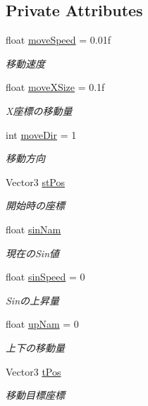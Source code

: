 \subsection*{Private Attributes}
\begin{DoxyCompactItemize}
\item 
float \hyperlink{class_bat_a44b5842b7610432d93cbdcbbbedccc95}{move\+Speed} = 0.\+01f
\begin{DoxyCompactList}\small\item\em 移動速度 \end{DoxyCompactList}\item 
float \hyperlink{class_bat_a125bd45781b88b039b4cd2b96ecf9a74}{move\+X\+Size} = 0.\+1f
\begin{DoxyCompactList}\small\item\em X座標の移動量 \end{DoxyCompactList}\item 
int \hyperlink{class_bat_aa26440807bdeba3f4e860d7b8510b46a}{move\+Dir} = 1
\begin{DoxyCompactList}\small\item\em 移動方向 \end{DoxyCompactList}\item 
Vector3 \hyperlink{class_bat_a00b206a83145c2273d7d6b4241562f60}{st\+Pos}
\begin{DoxyCompactList}\small\item\em 開始時の座標 \end{DoxyCompactList}\item 
float \hyperlink{class_bat_a8c2d220af1b500e9c2e26ef3ee18757f}{sin\+Nam}
\begin{DoxyCompactList}\small\item\em 現在の\+Sin値 \end{DoxyCompactList}\item 
float \hyperlink{class_bat_a1fdb20de00fd364c6cf94fefdfa4305a}{sin\+Speed} = 0
\begin{DoxyCompactList}\small\item\em Sinの上昇量 \end{DoxyCompactList}\item 
float \hyperlink{class_bat_acb46e48ec1c0fcd8a0a3f4b3b6903672}{up\+Nam} = 0
\begin{DoxyCompactList}\small\item\em 上下の移動量 \end{DoxyCompactList}\item 
Vector3 \hyperlink{class_bat_a6520d007f8d93bb9d152706f69a7fe3f}{t\+Pos}
\begin{DoxyCompactList}\small\item\em 移動目標座標 \end{DoxyCompactList}\item 

\end{DoxyCompactItemize}
